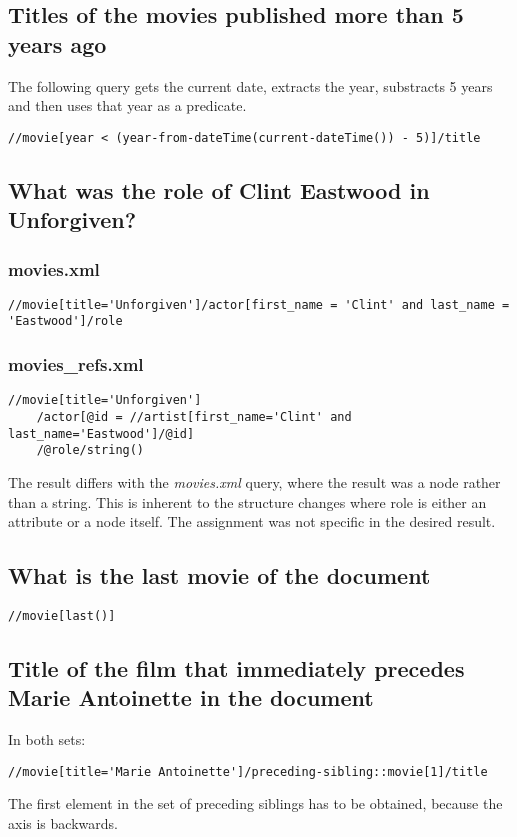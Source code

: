 \documentclass{article}
\begin{document}
\subsection{Titles of the movies published more than 5 years ago}
The following query gets the current date, extracts the year, substracts 5 years and then uses that year as a predicate.
\begin{verbatim}
//movie[year < (year-from-dateTime(current-dateTime()) - 5)]/title
\end{verbatim}

\subsection{What was the role of Clint Eastwood in Unforgiven?}
\subsubsection{movies.xml}
\begin{verbatim}
//movie[title='Unforgiven']/actor[first_name = 'Clint' and last_name = 'Eastwood']/role
\end{verbatim}
\subsubsection{movies\_refs.xml}
\begin{verbatim}
//movie[title='Unforgiven']
	/actor[@id = //artist[first_name='Clint' and last_name='Eastwood']/@id]
	/@role/string()
\end{verbatim}
The result differs with the \emph{movies.xml} query, where the result was a node rather than a string. This is inherent to the structure changes where role is either an attribute or a node itself. The assignment was not specific in the desired result.

\subsection{What is the last movie of the document}
\begin{verbatim}
//movie[last()]
\end{verbatim}

\subsection{Title of the film that immediately precedes Marie Antoinette in the document}
In both sets:
\begin{verbatim}
//movie[title='Marie Antoinette']/preceding-sibling::movie[1]/title
\end{verbatim}
The first element in the set of preceding siblings has to be obtained, because the axis is backwards.
\end{document}
